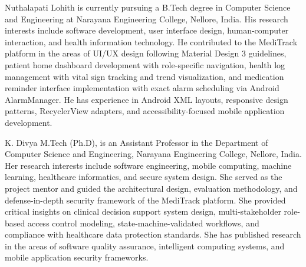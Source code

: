 \documentclass[journal,onecolumn,web]{ieeecolor}
\begin{document}
\begin{IEEEbiographynophoto}{Nuthalapati Lohith}
is currently pursuing a B.Tech degree in Computer
Science and Engineering at Narayana Engineering
College, Nellore, India. His research interests
include software development, user interface design,
human-computer interaction, and health information
technology. He contributed to the MediTrack platform
in the areas of UI/UX design following Material Design
3 guidelines, patient home dashboard development with
role-specific navigation, health log management with
vital sign tracking and trend visualization, and
medication reminder interface implementation with
exact alarm scheduling via Android AlarmManager. He
has experience in Android XML layouts, responsive
design patterns, RecyclerView adapters, and
accessibility-focused mobile application development.
\end{IEEEbiographynophoto}

\begin{IEEEbiographynophoto}{K. Divya}
M.Tech (Ph.D), is an Assistant Professor in the
Department of Computer Science and Engineering,
Narayana Engineering College, Nellore, India. Her
research interests include software engineering,
mobile computing, machine learning, healthcare
informatics, and secure system design. She served
as the project mentor and guided the architectural
design, evaluation methodology, and defense-in-depth
security framework of the MediTrack platform. She
provided critical insights on clinical decision
support system design, multi-stakeholder role-based
access control modeling, state-machine-validated
workflows, and compliance with healthcare data
protection standards. She has published research
in the areas of software quality assurance,
intelligent computing systems, and mobile application
security frameworks.
\end{IEEEbiographynophoto}
\end{document}
